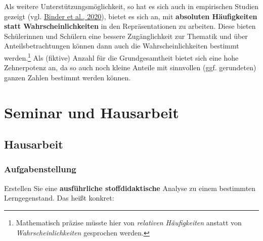\documentclass[
]{scrbook}
\theoremstyle{definition}
\theoremstyle{definition}
\theoremstyle{definition}
\theoremstyle{definition}
\theoremstyle{remark}
\begin{document}
Als weitere Unterstützungsmöglichkeit, so hat es sich auch in empirischen Studien gezeigt (vgl. \protect\hyperlink{ref-Binder2020}{Binder et al., 2020}), bietet es sich an, mit \textbf{absoluten Häufigkeiten statt Wahrscheinlichkeiten} in den Repräsentationen zu arbeiten. Diese bieten Schülerinnen und Schülern eine bessere Zugänglichkeit zur Thematik und über Anteilsbetrachtungen können dann auch die Wahrscheinlichkeiten bestimmt werden.\footnote{Mathematisch präzise müsste hier von \emph{relativen Häufigkeiten} anstatt von \emph{Wahrscheinlichkeiten} gesprochen werden.} Als (fiktive) Anzahl für die Grundgesamtheit bietet sich eine hohe Zehnerpotenz an, da so auch noch kleine Anteile mit sinnvollen (ggf. gerundeten) ganzen Zahlen bestimmt werden können.

\hypertarget{appendix-anhang}{%
\appendix}


\hypertarget{seminar-und-hausarbeit}{%
\chapter{Seminar und Hausarbeit}\label{seminar-und-hausarbeit}}

\hypertarget{hausarbeit}{%
\section{Hausarbeit}\label{hausarbeit}}

\hypertarget{aufgabenstellung}{%
\subsection{Aufgabenstellung}\label{aufgabenstellung}}

Erstellen Sie eine \textbf{ausführliche stoffdidaktische} Analyse zu einem bestimmten Lerngegenstand. Das heißt konkret:
\end{document}
